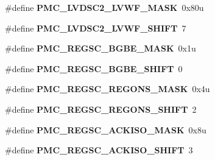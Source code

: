 \begin{DoxyCompactItemize}
\item 
\#define {\bfseries P\+M\+C\+\_\+\+L\+V\+D\+S\+C2\+\_\+\+L\+V\+W\+F\+\_\+\+M\+A\+SK}~0x80u\hypertarget{group__PMC__Register__Masks_ga34187b0598a3e166a457818770a616d4}{}\label{group__PMC__Register__Masks_ga34187b0598a3e166a457818770a616d4}

\item 
\#define {\bfseries P\+M\+C\+\_\+\+L\+V\+D\+S\+C2\+\_\+\+L\+V\+W\+F\+\_\+\+S\+H\+I\+FT}~7\hypertarget{group__PMC__Register__Masks_ga8bcfb9fc5fd4a92164b2aa6cdb6db77e}{}\label{group__PMC__Register__Masks_ga8bcfb9fc5fd4a92164b2aa6cdb6db77e}

\item 
\#define {\bfseries P\+M\+C\+\_\+\+R\+E\+G\+S\+C\+\_\+\+B\+G\+B\+E\+\_\+\+M\+A\+SK}~0x1u\hypertarget{group__PMC__Register__Masks_ga98cf5c98c133e20fb620faa6ca29d98e}{}\label{group__PMC__Register__Masks_ga98cf5c98c133e20fb620faa6ca29d98e}

\item 
\#define {\bfseries P\+M\+C\+\_\+\+R\+E\+G\+S\+C\+\_\+\+B\+G\+B\+E\+\_\+\+S\+H\+I\+FT}~0\hypertarget{group__PMC__Register__Masks_ga2e23aa8155158c86fc53ccd8baccf24d}{}\label{group__PMC__Register__Masks_ga2e23aa8155158c86fc53ccd8baccf24d}

\item 
\#define {\bfseries P\+M\+C\+\_\+\+R\+E\+G\+S\+C\+\_\+\+R\+E\+G\+O\+N\+S\+\_\+\+M\+A\+SK}~0x4u\hypertarget{group__PMC__Register__Masks_gab830f2c82eef6d0db7caab8ee5689ba6}{}\label{group__PMC__Register__Masks_gab830f2c82eef6d0db7caab8ee5689ba6}

\item 
\#define {\bfseries P\+M\+C\+\_\+\+R\+E\+G\+S\+C\+\_\+\+R\+E\+G\+O\+N\+S\+\_\+\+S\+H\+I\+FT}~2\hypertarget{group__PMC__Register__Masks_ga06b4e6d970f2610a635c92bb1270541d}{}\label{group__PMC__Register__Masks_ga06b4e6d970f2610a635c92bb1270541d}

\item 
\#define {\bfseries P\+M\+C\+\_\+\+R\+E\+G\+S\+C\+\_\+\+A\+C\+K\+I\+S\+O\+\_\+\+M\+A\+SK}~0x8u\hypertarget{group__PMC__Register__Masks_ga35ced6f0f133b2d5892bdcba3e0b2832}{}\label{group__PMC__Register__Masks_ga35ced6f0f133b2d5892bdcba3e0b2832}

\item 
\#define {\bfseries P\+M\+C\+\_\+\+R\+E\+G\+S\+C\+\_\+\+A\+C\+K\+I\+S\+O\+\_\+\+S\+H\+I\+FT}~3\hypertarget{group__PMC__Register__Masks_gad2b9b6ce6aa455e8607fd3c2d1647544}{}\label{group__PMC__Register__Masks_gad2b9b6ce6aa455e8607fd3c2d1647544}


\end{DoxyCompactItemize}
